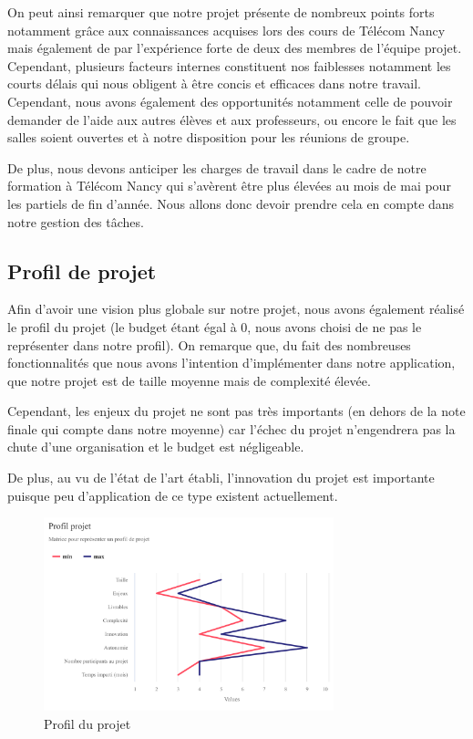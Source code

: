 \documentclass[french,a4paper]{article}
\begin{document}
On peut ainsi remarquer que notre projet présente de nombreux points forts notamment grâce aux connaissances acquises lors des cours de Télécom Nancy 
mais également de par l’expérience forte de deux des membres de l’équipe projet.  Cependant, plusieurs facteurs internes constituent nos faiblesses
 notamment les courts délais qui nous obligent à être concis et efficaces dans notre travail. Cependant, nous avons également des opportunités notamment 
 celle de pouvoir demander de l'aide aux autres élèves et aux professeurs, ou encore le fait que les salles soient ouvertes et à notre disposition pour
 les réunions de groupe.

De plus, nous devons anticiper les charges de travail dans le cadre de notre formation à Télécom Nancy qui s'avèrent être plus élevées au mois de mai 
pour les partiels de fin d'année. Nous allons donc devoir prendre cela en compte dans notre gestion des tâches.

\subsection{Profil de projet}

Afin d’avoir une vision plus globale sur notre projet, nous avons également réalisé le profil du projet (le budget étant égal à 0, nous avons choisi de ne pas le représenter dans notre profil). On remarque que, du fait des nombreuses fonctionnalités que nous avons l’intention d’implémenter dans notre application, que notre projet est de taille moyenne mais de complexité élevée.

Cependant, les enjeux du projet ne sont pas très importants (en dehors de la note finale qui compte dans notre moyenne) car l'échec du projet n'engendrera pas la chute d'une organisation et le budget est négligeable.

De plus, au vu de l’état de l’art établi, l’innovation du projet est importante puisque peu d'application de ce type existent actuellement.

\begin{figure}[H]
    \centering
    \includegraphics[width=0.75\textwidth]{img/profil_projet.png}
    \caption{Profil du projet}
\end{figure}
\end{document}
